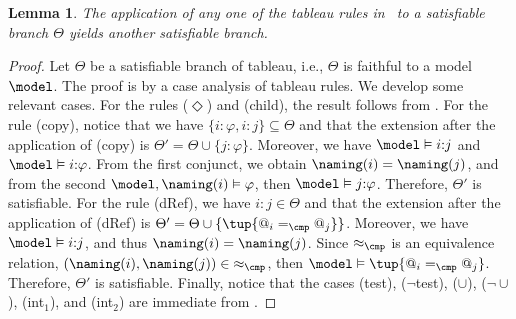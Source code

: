 \documentclass[10pt,a4paper]{amsart}
\newtheorem{lem}[thm]{Lemma}
\theoremstyle{definition}
\theoremstyle{remark}
\begin{document}
\begin{lem}
    \label{lemma:soundness}
    The application of any one of the tableau rules in~ to a satisfiable branch $\Theta$ yields another satisfiable branch.
\end{lem}

\begin{proof}
    Let $\Theta$ be a satisfiable branch of tableau,  i.e.,
    $\Theta$ is faithful to a model $\model$.
    The proof is by a case analysis of tableau rules.
    We develop some relevant cases.
    For the rules ($\Diamond$) and (child), the result follows from .
    For the rule (copy), notice that we have $\{i{:}\varphi, i{:}j\} \subseteq \Theta$ and that the extension after the application of (copy) is $\Theta' = \Theta \cup \{j{:}\varphi\}$.
    Moreover, we have $\model \vDash i{:}j$ and $\model \vDash i{:}\varphi$.
    From the first conjunct, we obtain $\naming(i) = \naming(j)$, and from the second $\model, \naming(i) \vDash \varphi$, 
    then $\model \vDash j{:}\varphi$.
    Therefore, $\Theta'$ is satisfiable.
    For the rule (dRef),
    we have $i{:}j \in \Theta$ and that the extension after the application of (dRef) is $\Theta' = \Theta \cup \{\tup{@_i =_{\cmp} @_j}\}$.
    Moreover, we have $\model \vDash i{:}j$, and thus $\naming(i) = \naming(j)$.
    Since $\approx_{\cmp}$ is an equivalence relation, $(\naming(i), \naming(j)) \in {\approx_{\cmp}}$, then $\model \vDash \tup{@_i =_{\cmp} @_j}$.
    Therefore, $\Theta'$ is satisfiable.
    Finally, notice that the cases (test), ($\lnot$test), ($\cup$), (${\lnot}{\cup}$), (int$_1$), and (int$_2$) are immediate from .
\end{proof} 
\end{document}
